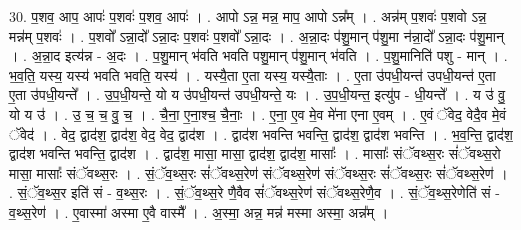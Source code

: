 \documentclass[17pt]{extarticle}
\begin{document}
30. प॒शव॒ आप॒ आपः॑ प॒शवः॑ प॒शव॒ आपः॑ । . आपो ऽन्न॒ मन्न॒ माप॒ आपो ऽन्न᳚म् । . अन्न॑म् प॒शवः॑ प॒शवो ऽन्न॒ मन्न॑म् प॒शवः॑ । . प॒शवो᳚ ऽन्ना॒दो᳚ ऽन्ना॒दः प॒शवः॑ प॒शवो᳚ ऽन्ना॒दः । . अ॒न्ना॒दः प॑शु॒मान् प॑शु॒मा न॑न्ना॒दो᳚ ऽन्ना॒दः प॑शु॒मान् । . अ॒न्ना॒द इत्य॑न्न - अ॒दः । . प॒शु॒मान् भ॑वति भवति पशु॒मान् प॑शु॒मान् भ॑वति । . प॒शु॒मानिति॑ पशु - मान् । . भ॒व॒ति॒ यस्य॒ यस्य॑ भवति भवति॒ यस्य॑ । . यस्यै॒ता ए॒ता यस्य॒ यस्यै॒ताः । . ए॒ता उ॑पधी॒यन्त॑ उपधी॒यन्त॑ ए॒ता ए॒ता उ॑पधी॒यन्ते᳚ । . उ॒प॒धी॒यन्ते॒ यो य उ॑पधी॒यन्त॑ उपधी॒यन्ते॒ यः । . उ॒प॒धी॒यन्त॒ इत्यु॑प - धी॒यन्ते᳚ । . य उ॑ वु॒ यो य उ॑ । . उ॒ च॒ च॒ वु॒ च॒ । . चै॒ना॒ ए॒ना॒श्च॒ चै॒नाः॒ । . ए॒ना॒ ए॒व मे॒व मे॑ना एना ए॒वम् । . ए॒वं ॅवेद॒ वेदै॒व मे॒वं ॅवेद॑ । . वेद॒ द्वाद॑श॒ द्वाद॑श॒ वेद॒ वेद॒ द्वाद॑श । . द्वाद॑श भवन्ति भवन्ति॒ द्वाद॑श॒ द्वाद॑श भवन्ति । . भ॒व॒न्ति॒ द्वाद॑श॒ द्वाद॑श भवन्ति भवन्ति॒ द्वाद॑श । . द्वाद॑श॒ मासा॒ मासा॒ द्वाद॑श॒ द्वाद॑श॒ मासाः᳚ । . मासाः᳚ संॅवथ्स॒रः सं॑ॅवथ्स॒रो मासा॒ मासाः᳚ संॅवथ्स॒रः । . सं॒ॅव॒थ्स॒रः सं॑ॅवथ्स॒रेण॑ संॅवथ्स॒रेण॑ संॅवथ्स॒रः सं॑ॅवथ्स॒रः सं॑ॅवथ्स॒रेण॑ । . सं॒ॅव॒थ्स॒र इति॑ सं - व॒थ्स॒रः । . सं॒ॅव॒थ्स॒रे णै॒वैव सं॑ॅवथ्स॒रेण॑ संॅवथ्स॒रेणै॒व । . सं॒ॅव॒थ्स॒रेणेति॑ सं - व॒थ्स॒रेण॑ । . ए॒वास्मा॑ अस्मा ए॒वै वास्मै᳚ । . अ॒स्मा॒ अन्न॒ मन्न॑ मस्मा अस्मा॒ अन्न᳚म् । \newline
\end{document}
